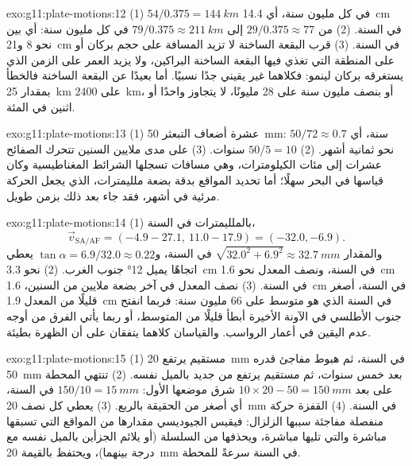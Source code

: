 \begin{solution}{exo:g11:plate-motions:12}
(1) $54/0.375 = \qty{144}{km}$ في كل مليون سنة، أي \qty{14.4}{cm} في السنة. (2)
من $29/0.375 \approx 77$ إلى $79/0.375 \approx \qty{211}{km}$ في كل مليون
سنة: أي بين نحو 8 و\qty{21}{cm} في السنة. (3) قرب البقعة الساخنة لا تزيد
المسافة على حجم بركان أو على المنطقة التي تغذي فيها
البقعة الساخنة البراكين، ولا يزيد العمر على الزمن الذي يستغرقه بركان
لينمو: فكلاهما غير يقيني جدًا نسبيًا. أما بعيدًا عن
البقعة الساخنة فالخطأ بمقدار \qty{25}{km} على \qty{2400}{km}، أو بنصف مليون سنة
على 28 مليونًا، لا يتجاوز واحدًا أو اثنين في المئة.
\end{solution}

\begin{solution}{exo:g11:plate-motions:13}
(1) عشرة أضعاف التبعثر \qty{50}{mm}: $50/72 \approx 0.7$ سنة، أي نحو
ثمانية أشهر. (2) $50/5 = 10$ سنوات. (3) على مدى ملايين السنين تتحرك الصفائح
عشرات إلى مئات الكيلومترات، وهي مسافات تسجلها الشرائط المغناطيسية وكان
قياسها في البحر سهلًا؛ أما تحديد المواقع بدقة بضعة ملليمترات،
الذي يجعل الحركة مرئية في أشهر، فقد جاء بعد ذلك بزمن طويل.
\end{solution}

\begin{solution}{exo:g11:plate-motions:14}
(1) بالملليمترات في السنة،
\[
  \vec v_{\mathrm{SA/AF}} = (-4.9 - 27.1,\ 11.0 - 17.9) = (-32.0, -6.9).
\] والمقدار $\sqrt{32.0^2 + 6.9^2} \approx
\qty{32.7}{mm}$ في السنة، و$\tan\alpha = 6.9/32.0 \approx 0.22$ يعطي
اتجاهًا يميل \ang{12} جنوب الغرب. (2)  نحو \qty{3.3}{cm} في
السنة، ونصف المعدل نحو \qty{1.6}{cm} في السنة. (3) نصف المعدل في آخر
بضعة ملايين من السنين، \qty{1.6}{cm} في السنة، أصغر قليلًا من
المعدل \qty{1.9}{cm} في السنة الذي هو متوسط على 66 مليون سنة: فربما
انفتح جنوب الأطلسي في الآونة الأخيرة أبطأ قليلًا من المتوسط، أو ربما
يأتي الفرق من أوجه عدم اليقين في أعمار الرواسب. والقياسان كلاهما يتفقان
على أن الظهرة بطيئة.
\end{solution}

\begin{solution}{exo:g11:plate-motions:15}
(1) مستقيم يرتفع \qty{20}{mm} في السنة، ثم هبوط مفاجئ قدره
\qty{50}{mm} بعد خمس سنوات، ثم مستقيم يرتفع من جديد بالميل نفسه.
(2) تنتهي المحطة على بعد $10 \times 20 - 50 = \qty{150}{mm}$ شرق موضعها الأول:
$150/10 = \qty{15}{mm}$ في السنة، أي أصغر من الحقيقة بالربع. (3) يعطي كل نصف
\qty{20}{mm} في السنة. (4) القفزة حركة منفصلة مفاجئة سببها
الزلزال: فيقيس الجيوديسي مقدارها من المواقع التي تسبقها مباشرة
والتي تليها مباشرة، ويحذفها من السلسلة (أو يلائم الجزأين بالميل
نفسه مع درجة بينهما)، ويحتفظ بالقيمة \qty{20}{mm} في السنة سرعةً
للمحطة.
\end{solution}

